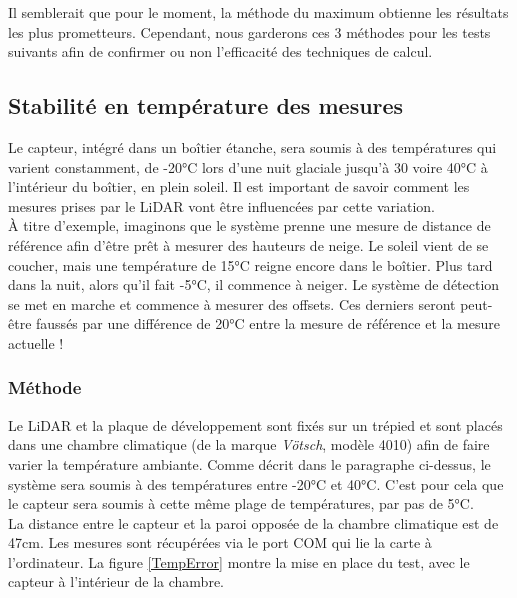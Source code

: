 Il semblerait que pour le moment, la méthode du maximum obtienne les résultats les plus prometteurs.
Cependant, nous garderons ces 3 méthodes pour les tests suivants afin de confirmer ou non l'efficacité
des techniques de calcul.

\subsection{Stabilité en température des mesures}

Le capteur, intégré dans un boîtier étanche, sera soumis à des températures qui varient constamment,
de -20°C lors d'une nuit glaciale jusqu'à 30 voire 40°C à l'intérieur du boîtier, en plein soleil.
Il est important de savoir comment les mesures prises par le LiDAR vont être influencées par cette 
variation.\\
À titre d'exemple, imaginons que le système prenne une mesure de distance de référence afin d'être
prêt à mesurer des hauteurs de neige. Le soleil vient de se coucher, mais une température de 15°C
reigne encore dans le boîtier. Plus tard dans la nuit, alors qu'il fait -5°C, il commence à neiger.
Le système de détection se met en marche et commence à mesurer des offsets. Ces derniers seront
peut-être faussés par une différence de 20°C entre la mesure de référence et la mesure actuelle !

\subsubsection{Méthode}

Le LiDAR et la plaque de développement sont fixés sur un trépied et sont placés dans une chambre
climatique (de la marque \emph{Vötsch}, modèle 4010) afin de faire varier la température ambiante.
Comme décrit dans le paragraphe ci-dessus, le système sera soumis à des températures entre -20°C et
40°C. C'est pour cela que le capteur sera soumis à cette même plage de températures, par pas de 5°C.\\
La distance entre le capteur et la paroi opposée de la chambre climatique est de 47cm. Les mesures 
sont récupérées via le port COM qui lie la carte à l'ordinateur. La figure \ref{TempError} montre 
la mise en place du test, avec le capteur à l'intérieur de la chambre.

